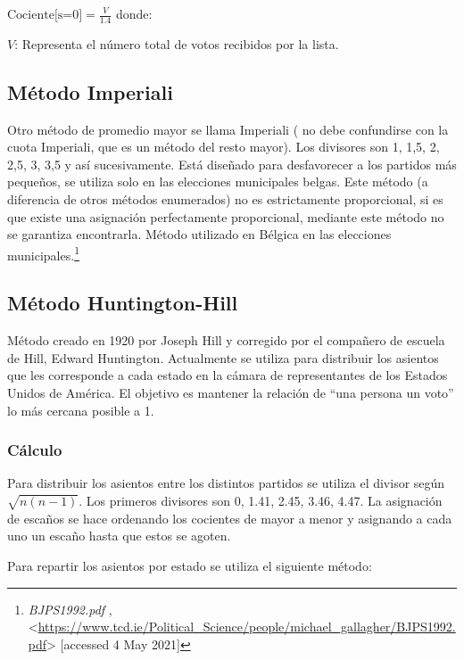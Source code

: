 \documentclass[12pt,a4paper,]{book}
\let\rmarkdownfootnote\footnote%
\def\footnote{\protect\rmarkdownfootnote}
\numberwithin{dummy}{section}
\theoremstyle{ocrenumbox}
\theoremstyle{blacknumex}
\theoremstyle{blacknumbox}
\theoremstyle{ocrenum}
\theoremstyle{ocrenum}
\begin{document}
\(\textrm{Cociente[s=0]} = \frac{V}{1.4}\) donde:

\(V\): Representa el número total de votos recibidos por la lista.

\hypertarget{muxe9todo-imperiali}{%
\subsection{Método Imperiali}\label{muxe9todo-imperiali}}

Otro método de promedio mayor se llama Imperiali ( no debe confundirse
con la cuota Imperiali, que es un método del resto mayor). Los divisores
son 1, 1,5, 2, 2,5, 3, 3,5 y así sucesivamente. Está diseñado para
desfavorecer a los partidos más pequeños, se utiliza solo en las
elecciones municipales belgas. Este método (a diferencia de otros
métodos enumerados) no es estrictamente proporcional, si es que existe
una asignación perfectamente proporcional, mediante este método no se
garantiza encontrarla. Método utilizado en Bélgica en las elecciones
municipales.\footnote{\emph{BJPS1992.pdf} ,
  \textless{}\url{https://www.tcd.ie/Political_Science/people/michael_gallagher/BJPS1992.pdf}\textgreater{}
  {[}accessed 4 May 2021{]}}

\hypertarget{muxe9todo-huntington-hill}{%
\subsection{Método Huntington-Hill}\label{muxe9todo-huntington-hill}}

Método creado en 1920 por Joseph Hill y corregido por el compañero de
escuela de Hill, Edward Huntington. Actualmente se utiliza para
distribuir los asientos que les corresponde a cada estado en la cámara
de representantes de los Estados Unidos de América. El objetivo es
mantener la relación de ``una persona un voto'' lo más cercana posible a
1.

\hypertarget{cuxe1lculo}{%
\subsubsection{Cálculo}\label{cuxe1lculo}}

Para distribuir los asientos entre los distintos partidos se utiliza el
divisor según \(\sqrt{n(n-1)}\). Los primeros divisores son 0, 1.41,
2.45, 3.46, 4.47. La asignación de escaños se hace ordenando los
cocientes de mayor a menor y asignando a cada uno un escaño hasta que
estos se agoten.

Para repartir los asientos por estado se utiliza el siguiente método:
\end{document}
